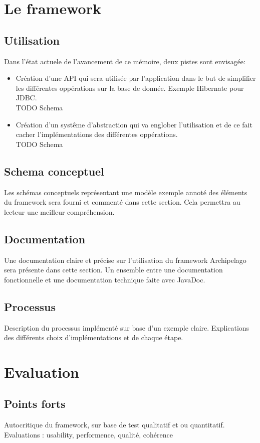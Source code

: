 \documentclass[a4paper,12pt,twoside, fleqn]{report}
\begin{document}
\chapter{Le framework}
\section{Utilisation}
Dans l'état actuele de l'avancement de ce mémoire, deux pistes sont envisagée:
\begin{itemize}
\item Création d'une API qui sera utilisée par l'application dans le but de simplifier les différentes oppérations sur la base de donnée. Exemple Hibernate pour JDBC.\\
TODO Schema
\item Création d'un systême d'abstraction qui va englober l'utilisation et de ce fait cacher l'implémentations des différentes oppérations.\\
TODO Schema 
\end{itemize}
\section{Schema conceptuel}
Les schémas conceptuels représentant une modèle exemple annoté des éléments du framework sera fourni et commenté dans cette section. Cela permettra au lecteur une meilleur compréhension.
\section{Documentation}
Une documentation claire et précise sur l'utilisation du framework Archipelago sera présente dans cette section. Un ensemble entre une documentation fonctionnelle et une documentation technique faite avec JavaDoc.
\section{Processus}
Description du processus implémenté sur base d'un exemple claire. Explications des différents choix d'implémentations et de chaque étape.
\chapter{Evaluation}
\section{Points forts}
Autocritique du framework, sur base de test qualitatif et ou quantitatif. Evaluations : usability, performence, qualité, cohérence
\end{document}

